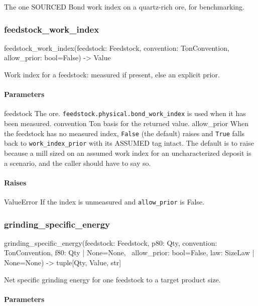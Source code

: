 \documentclass[10pt,a4paper,twoside]{report}
\begin{document}
The one SOURCED Bond work index on a quartz-rich ore, for benchmarking.

\subsubsection*{feedstock\_work\_index}

\begin{verbatimsmall}
feedstock_work_index(feedstock: Feedstock, convention: TonConvention, allow_prior: bool=False) -> Value
\end{verbatimsmall}

Work index for a feedstock: measured if present, else an explicit prior.

\paragraph*{Parameters}

feedstock The ore. \texttt{feedstock.physical.bond\_work\_index} is used when it has been measured. convention Ton basis for the returned value. allow\_prior When the feedstock has no measured index, \texttt{False} (the default) raises and \texttt{True} falls back to \texttt{work\_index\_prior} with its ASSUMED tag intact. The default is to raise because a mill sized on an assumed work index for an uncharacterized deposit is a scenario, and the caller should have to say so.

\paragraph*{Raises}

ValueError If the index is unmeasured and \texttt{allow\_prior} is False.

\subsubsection*{grinding\_specific\_energy}

\begin{verbatimsmall}
grinding_specific_energy(feedstock: Feedstock, p80: Qty, convention: TonConvention, f80: Qty | None=None, 
    \ allow_prior: bool=False, law: SizeLaw | None=None) -> tuple[Qty, Value, str]
\end{verbatimsmall}

Net specific grinding energy for one feedstock to a target product size.

\paragraph*{Parameters}
\end{document}

